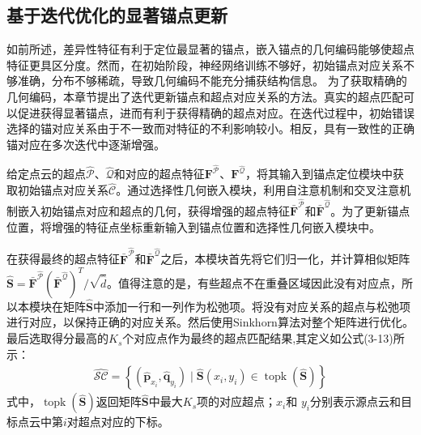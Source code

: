    \subsection{基于迭代优化的显著锚点更新}
    如前所述，差异性特征有利于定位最显著的锚点，嵌入锚点的几何编码能够使超点特征更具区分度。然而，在初始阶段，神经网络训练不够好，初始锚点对应关系不够准确，分布不够稀疏，导致几何编码不能充分捕获结构信息。
    为了获取精确的几何编码，本章节提出了迭代更新锚点和超点对应关系的方法。真实的超点匹配可以促进获得显著锚点，进而有利于获得精确的超点对应。在迭代过程中，初始错误选择的锚对应关系由于不一致而对特征的不利影响较小。相反，具有一致性的正确锚对应在多次迭代中逐渐增强。

    给定点云的超点$\hat{\mathcal{P}}$、$\hat{\mathcal{Q}}$和对应的超点特征$\mathbf{F}^{\hat{\mathcal{P}}}$、$\mathbf{F}^{\hat{\mathcal{Q}}}$，将其输入到锚点定位模块中获取初始锚点对应关系$\hat{\mathcal{C}}$。通过选择性几何嵌入模块，利用自注意机制和交叉注意机制嵌入初始锚点对应和超点的几何，获得增强的超点特征$\bar{\mathbf{F}}^{\hat{\mathcal{P}}}$和$\bar{\mathbf{F}}^{\hat{\mathcal{Q}}}$。为了更新锚点位置，将增强的特征点坐标重新输入到锚点位置和选择性几何嵌入模块中。

    在获得最终的超点特征$\bar{\mathbf{F}}^{\hat{\mathcal{P}}}$和$\bar{\mathbf{F}}^{\hat{\mathcal{Q}}}$之后，本模块首先将它们归一化，并计算相似矩阵$\hat{\mathbf{S}} = \bar{\mathbf{F}}^{\hat{\mathcal{P}}} (\bar{\mathbf{F}}^{\hat{\mathcal{Q}}})^T /\sqrt{\hat{d}}$。值得注意的是，有些超点不在重叠区域因此没有对应点，所以本模块在矩阵$\hat{\mathbf{S}}$中添加一行和一列作为松弛项。将没有对应关系的超点与松弛项进行对应，以保持正确的对应关系。然后使用Sinkhorn算法对整个矩阵进行优化。最后选取得分最高的$K_s$个对应点作为最终的超点匹配结果,其定义如公式(3-13)所示：
    \begin{equation}
        \begin{aligned}
        \mathcal{\hat{SC}}=
        \left\{
        (\mathbf{\hat{p}}_{x_{i}}, \mathbf{\hat{q}}_{y_{i}}) \mid
        \mathbf{\hat{S}}(x_{i}, y_{i}) \in \operatorname{topk}(\mathbf{\hat{S}})
        \right\}
        \end{aligned}
    \end{equation}
    式中，$\operatorname{topk}(\hat{\mathbf{S}})$返回矩阵$\hat{\mathbf{S}}$中最大$K_s$项的对应超点；$x_{i}$和 $y_{i}$分别表示源点云和目标点云中第$i$对超点对应的下标。

